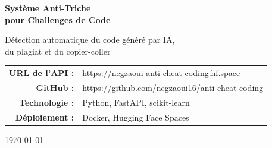 \documentclass[12pt,a4paper]{report}
\begin{document}
\begin{titlepage}
    \centering
    \vspace*{2cm}
    
    {\Huge\bfseries\color{primaryblue} Système Anti-Triche\\[0.5cm]
    pour Challenges de Code\par}
    
    \vspace{1cm}
    
    {\Large\color{gray} Détection automatique du code généré par IA,\\
    du plagiat et du copier-coller\par}
    
    \vspace{2cm}
    
    
    \vspace{2cm}
    
    {\large
    \begin{tabular}{rl}
        \textbf{URL de l'API :} & \url{https://negzaoui-anti-cheat-coding.hf.space} \\[0.3cm]
        \textbf{GitHub :} & \url{https://github.com/negzaoui16/anti-cheat-coding} \\[0.3cm]
        \textbf{Technologie :} & Python, FastAPI, scikit-learn \\[0.3cm]
        \textbf{Déploiement :} & Docker, Hugging Face Spaces \\
    \end{tabular}
    \par}
    
    \vfill
    
    {\large \today\par}
\end{titlepage}
\end{document}
